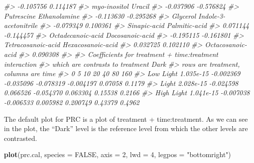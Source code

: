 \documentclass[
]{article}
\newenvironment{Shaded}{\begin{snugshade}}{\end{snugshade}}
\newcommand{\AttributeTok}[1]{\textcolor[rgb]{0.13,0.29,0.53}{#1}}
\newcommand{\CommentTok}[1]{\textcolor[rgb]{0.56,0.35,0.01}{\textit{#1}}}
\newcommand{\ConstantTok}[1]{\textcolor[rgb]{0.56,0.35,0.01}{#1}}
\newcommand{\DecValTok}[1]{\textcolor[rgb]{0.00,0.00,0.81}{#1}}
\newcommand{\FunctionTok}[1]{\textcolor[rgb]{0.13,0.29,0.53}{\textbf{#1}}}
\newcommand{\NormalTok}[1]{#1}
\newcommand{\StringTok}[1]{\textcolor[rgb]{0.31,0.60,0.02}{#1}}
\begin{document}
\begin{Shaded}
\begin{Highlighting}[]
\CommentTok{\#\textgreater{}                  {-}0.105756                   0.114187 }
\CommentTok{\#\textgreater{}               myo{-}inositol                     Uracil }
\CommentTok{\#\textgreater{}                  {-}0.037906                  {-}0.576824 }
\CommentTok{\#\textgreater{}                 Putrescine               Ethanolamine }
\CommentTok{\#\textgreater{}                  {-}0.113630                  {-}0.295268 }
\CommentTok{\#\textgreater{}                   Glycerol      Indole{-}3{-}acetonitrile }
\CommentTok{\#\textgreater{}                  {-}0.079349                   0.100361 }
\CommentTok{\#\textgreater{}               Sinapic{-}acid              Palmitic{-}acid }
\CommentTok{\#\textgreater{}                   0.071144                  {-}0.144457 }
\CommentTok{\#\textgreater{}          Octadecanoic{-}acid            Docosanoic{-}acid }
\CommentTok{\#\textgreater{}                  {-}0.195115                  {-}0.161801 }
\CommentTok{\#\textgreater{}         Tetracosanoic{-}acid          Hexacosanoic{-}acid }
\CommentTok{\#\textgreater{}                   0.032725                   0.102110 }
\CommentTok{\#\textgreater{}          Octacosanoic{-}acid }
\CommentTok{\#\textgreater{}                   0.090308 }
\CommentTok{\#\textgreater{} }
\CommentTok{\#\textgreater{} Coefficients for treatment + time:treatment interaction}
\CommentTok{\#\textgreater{} which are contrasts to treatment Dark }
\CommentTok{\#\textgreater{} rows are treatment, columns are time}
\CommentTok{\#\textgreater{}                    0         5        10        20        40      80    160}
\CommentTok{\#\textgreater{} Low Light  1.035e{-}15 {-}0.002369 {-}0.035096 {-}0.078319 {-}0.004197 0.07058 0.1179}
\CommentTok{\#\textgreater{} Light      2.028e{-}15 {-}0.024598  0.066526 {-}0.054370  0.063304 0.15538 0.2166}
\CommentTok{\#\textgreater{} High Light 1.041e{-}15 {-}0.007038 {-}0.006533  0.005982  0.200749 0.43379 0.4962}
\end{Highlighting}
\end{Shaded}

The default plot for PRC is a plot of treatment + time:treatment. As we
can see in the plot, the ``Dark'' level is the reference level from
which the other levels are contrasted.

\begin{Shaded}
\begin{Highlighting}[]
\FunctionTok{plot}\NormalTok{(prc.cal, }\AttributeTok{species =} \ConstantTok{FALSE}\NormalTok{, }\AttributeTok{axis =} \DecValTok{2}\NormalTok{, }\AttributeTok{lwd =} \DecValTok{4}\NormalTok{, }\AttributeTok{legpos =} \StringTok{"bottomright"}\NormalTok{)}
\end{Highlighting}
\end{Shaded}
\end{document}
